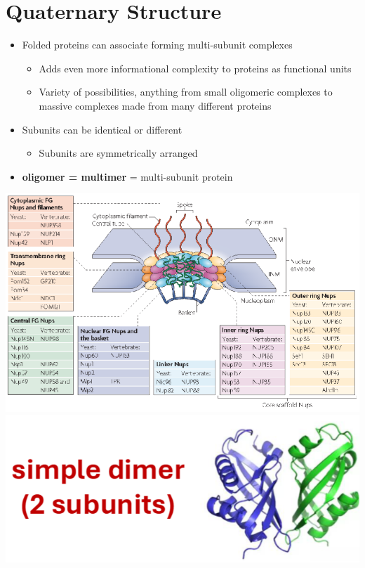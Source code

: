 \documentclass[10pt]{article}
\begin{document}
\section*{Quaternary Structure}
\begin{itemize}
    \item Folded proteins can associate forming multi-subunit complexes
    \begin{itemize}
        \item Adds even more informational complexity to proteins as functional units
        \item Variety of possibilities, anything from small oligomeric complexes to massive complexes made from many different proteins
    \end{itemize}
    \item Subunits can be identical or different
    \begin{itemize}
        \item Subunits are symmetrically arranged
    \end{itemize}
    \item \textbf{oligomer = multimer} = multi-subunit protein
\end{itemize}
\begin{center}
    \includegraphics*[scale=0.6]{L1_9.png}\\
    \includegraphics*[scale=0.4]{L1_10.png}
\end{center}
\end{document}
